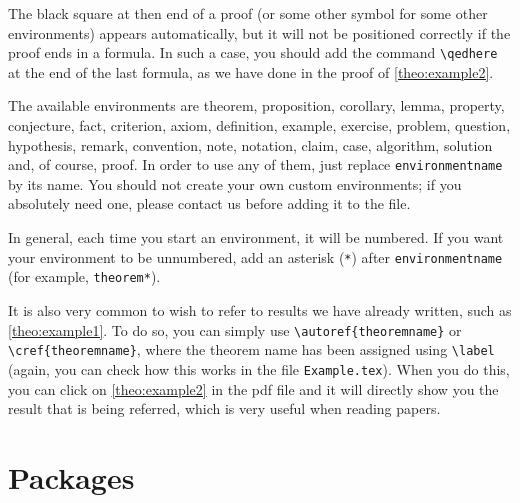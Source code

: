 \documentclass[babel-main=english]{TEMat-article}
\begin{document}
The black square at then end of a proof (or some other symbol for some other environments) appears automatically, but it will not be positioned correctly if the proof ends in a formula.
In such a case, you should add the command \verb+\qedhere+ at the end of the last formula, as we have done in the proof of \autoref{theo:example2}.

The available environments are theorem, proposition, corollary, lemma, property, conjecture, fact, criterion, axiom, definition, example, exercise, problem, question, hypothesis, remark, convention, note, notation, claim, case, algorithm, solution and, of course, proof.
In order to use any of them, just replace \verb+environmentname+ by its name.
You should not create your own custom environments; if you absolutely need one, please contact us before adding it to the file.

In general, each time you start an environment, it will be numbered.
If you want your environment to be unnumbered, add an asterisk (\verb+*+) after \verb+environmentname+ (for example, \verb+theorem*+).

It is also very common to wish to refer to results we have already written, such as \autoref{theo:example1}.
To do so, you can simply use \verb+\autoref{theoremname}+ or \verb+\cref{theoremname}+, where the theorem name has been assigned using \verb+\label+ (again, you can check how this works in the file \verb+Example.tex+).
When you do this, you can click on \autoref{theo:example2} in the pdf file and it will directly show you the result that is being referred, which is very useful when reading papers.



\section{Packages}
\end{document}
